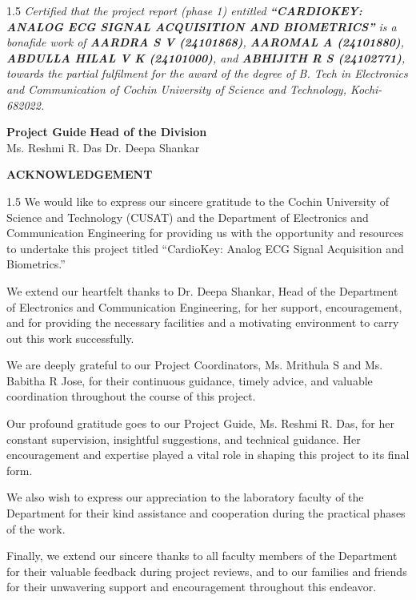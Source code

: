 \documentclass[12pt,a4paper]{report}
\begin{document}
\begin{spacing}{1.5}
\noindent \large \textit{Certified that the project report (phase 1) entitled \textbf{“CARDIOKEY: ANALOG ECG SIGNAL ACQUISITION AND BIOMETRICS”} is a bonafide work of \textbf{AARDRA S V (24101868)}, \textbf{AAROMAL A (24101880)}, \textbf{ABDULLA HILAL V K (24101000)}, and \textbf{ABHIJITH R S (24102771)}, towards the partial fulfilment for the award of the degree of B. Tech in Electronics and Communication of Cochin University of Science and Technology, Kochi-682022.}
\end{spacing}

\vspace{3cm}
\noindent \textbf{Project Guide} \hfill \textbf{Head of the Division}\\[0.5cm]
\noindent Ms. Reshmi R. Das \hfill Dr. Deepa Shankar

\newpage
\begin{center}
\Large \textbf{ACKNOWLEDGEMENT}\\[1cm]
\end{center}

\begin{spacing}{1.5}
\noindent We would like to express our sincere gratitude to the Cochin University of Science and Technology (CUSAT) and the Department of Electronics and Communication Engineering for providing us with the opportunity and resources to undertake this project titled “CardioKey: Analog ECG Signal Acquisition and Biometrics.”

\noindent We extend our heartfelt thanks to Dr. Deepa Shankar, Head of the Department of Electronics and Communication Engineering, for her support, encouragement, and for providing the necessary facilities and a motivating environment to carry out this work successfully.

\noindent We are deeply grateful to our Project Coordinators, Ms. Mrithula S and Ms. Babitha R Jose, for their continuous guidance, timely advice, and valuable coordination throughout the course of this project.

\noindent Our profound gratitude goes to our Project Guide, Ms. Reshmi R. Das, for her constant supervision, insightful suggestions, and technical guidance. Her encouragement and expertise played a vital role in shaping this project to its final form.

\noindent We also wish to express our appreciation to the laboratory faculty of the Department for their kind assistance and cooperation during the practical phases of the work.

\noindent Finally, we extend our sincere thanks to all faculty members of the Department for their valuable feedback during project reviews, and to our families and friends for their unwavering support and encouragement throughout this endeavor.
\end{spacing}
\end{document}
